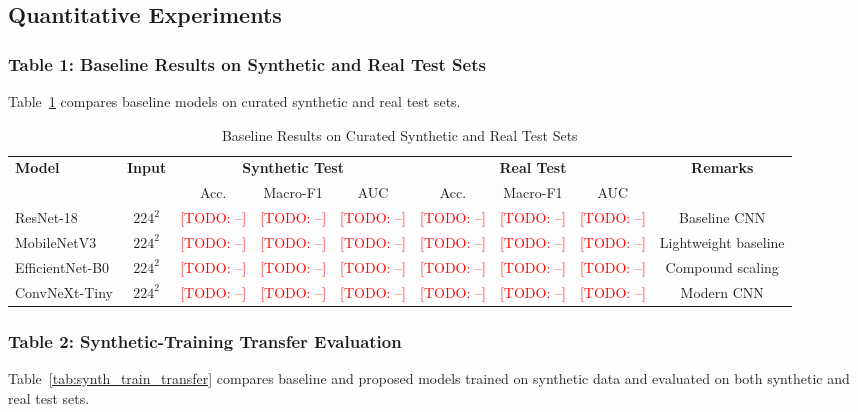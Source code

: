 \documentclass[journal]{IEEEtran}
\newcommand{\todo}[1]{\textcolor{red}{[TODO: #1]}}
\begin{document}
\subsection{Quantitative Experiments}
\label{subsec:quantitative}

\subsubsection{Table 1: Baseline Results on Synthetic and Real Test Sets}
Table~\ref{tab:baseline_synth_real} compares baseline models on curated synthetic and real test sets.

\begin{table}[!t]
\centering
\caption{Baseline Results on Curated Synthetic and Real Test Sets}
\label{tab:baseline_synth_real}
\begin{tabular}{lcccccccc}
\toprule
\multirow{2}{*}{\textbf{Model}} & \multirow{2}{*}{\textbf{Input}} & \multicolumn{3}{c}{\textbf{Synthetic Test}} & \multicolumn{3}{c}{\textbf{Real Test}} & \multirow{2}{*}{\textbf{Remarks}} \\
\cmidrule(lr){3-5}\cmidrule(lr){6-8}
& & Acc. & Macro-F1 & AUC & Acc. & Macro-F1 & AUC & \\
\midrule
ResNet-18 & $224^2$ & \todo{--} & \todo{--} & \todo{--} & \todo{--} & \todo{--} & \todo{--} & Baseline CNN \\
MobileNetV3 & $224^2$ & \todo{--} & \todo{--} & \todo{--} & \todo{--} & \todo{--} & \todo{--} & Lightweight baseline \\
EfficientNet-B0 & $224^2$ & \todo{--} & \todo{--} & \todo{--} & \todo{--} & \todo{--} & \todo{--} & Compound scaling \\
ConvNeXt-Tiny & $224^2$ & \todo{--} & \todo{--} & \todo{--} & \todo{--} & \todo{--} & \todo{--} & Modern CNN \\
\bottomrule
\end{tabular}
\end{table}

\subsubsection{Table 2: Synthetic-Training Transfer Evaluation}
Table~\ref{tab:synth_train_transfer} compares baseline and proposed models trained on synthetic data and evaluated on both synthetic and real test sets.
\end{document}
